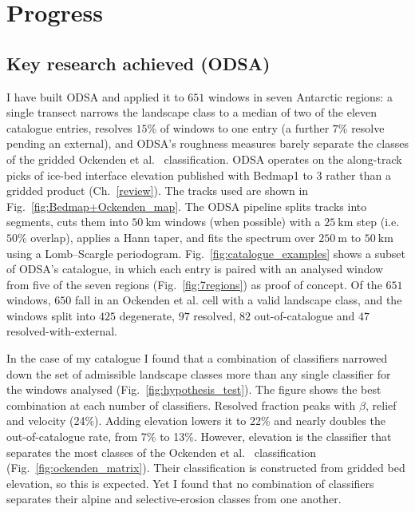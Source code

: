 \chapter{Progress}\label{progress}

\section{Key research achieved (ODSA)}

I have built ODSA and applied it to $651$ windows in seven Antarctic regions: a single
transect narrows the landscape class to a median of two of the eleven catalogue entries,
resolves $15$\% of windows to one entry (a further $7$\% resolve pending an external), and ODSA's roughness measures barely separate the
classes of the gridded Ockenden et al.~\cite{Ockenden_2026} classification.
ODSA operates on the along-track picks of ice-bed interface elevation published with
Bedmap1 to 3 rather than a gridded product (Ch.~\ref{review}). The tracks used are shown
in Fig.~\ref{fig:Bedmap+Ockenden_map}. The ODSA pipeline splits tracks into segments, cuts
them into $50~\mathrm{km}$ windows (when possible) with a $25~\mathrm{km}$ step (i.e.
$50$\% overlap), applies a Hann taper, and fits the spectrum over $250~\mathrm{m}$ to
$50~\mathrm{km}$ using a Lomb--Scargle periodogram.
Fig.~\ref{fig:catalogue_examples} shows a subset of ODSA's catalogue, in which each entry
is paired with an analysed window from five of the seven regions
(Fig.~\ref{fig:7regions}) as proof of concept. Of the $651$ windows, $650$ fall in an Ockenden et al. cell with a valid landscape class, and the windows split into $425$ degenerate, $97$ resolved, $82$ out-of-catalogue and $47$ resolved-with-external.

In the case of my catalogue I found that a combination of classifiers narrowed down the set of admissible landscape classes more than any single classifier for the windows analysed (Fig.~\ref{fig:hypothesis_test}). The figure shows the best combination at each number of classifiers. Resolved fraction peaks with $\beta$, relief and velocity (24\%). Adding elevation lowers it to 22\% and nearly doubles the out-of-catalogue rate, from 7\% to 13\%. However, elevation is the classifier that separates the most classes of the Ockenden et al.~\cite{Ockenden_2026} classification (Fig.~\ref{fig:ockenden_matrix}). Their classification is constructed from gridded bed elevation, so this is expected. Yet I found that no combination of classifiers separates their alpine and selective-erosion classes from one another.

